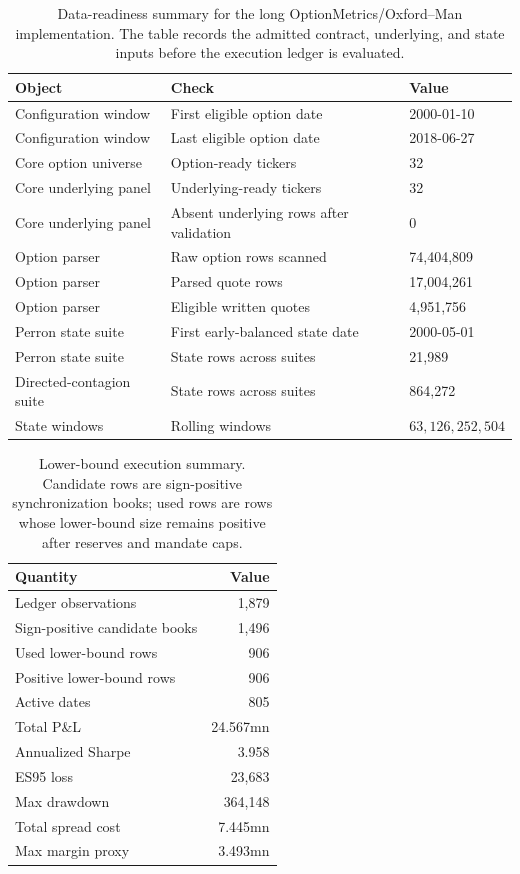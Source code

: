 \documentclass[11pt,a4paper]{amsart}
\newcommand{\tablecaptionskip}{\vspace{0.18em}}
\theoremstyle{plain}
\theoremstyle{definition}
\theoremstyle{remark}
\begin{document}
\begin{table}[H]
\centering
\caption{Data-readiness summary for the long OptionMetrics/Oxford--Man implementation.  The table
records the admitted contract, underlying, and state inputs before the execution ledger is
evaluated.}
\tablecaptionskip
\begin{tabular}{lll}
\toprule
Object & Check & Value\\
\midrule
Configuration window & First eligible option date & 2000-01-10\\
Configuration window & Last eligible option date & 2018-06-27\\
Core option universe & Option-ready tickers & 32\\
Core underlying panel & Underlying-ready tickers & 32\\
Core underlying panel & Absent underlying rows after validation & 0\\
Option parser & Raw option rows scanned & 74,404,809\\
Option parser & Parsed quote rows & 17,004,261\\
Option parser & Eligible written quotes & 4,951,756\\
Perron state suite & First early-balanced state date & 2000-05-01\\
Perron state suite & State rows across suites & 21,989\\
Directed-contagion suite & State rows across suites & 864,272\\
State windows & Rolling windows & \(63,126,252,504\)\\
\bottomrule
\end{tabular}
\label{tab:app-data-readiness}
\end{table}

\begin{table}[H]
\centering
\caption{Lower-bound execution summary.  Candidate rows are sign-positive synchronization
books; used rows are rows whose lower-bound size remains positive after reserves and mandate
caps.}
\tablecaptionskip
\begin{tabular}{lr}
\toprule
Quantity & Value\\
\midrule
Ledger observations & 1,879\\
Sign-positive candidate books & 1,496\\
Used lower-bound rows & 906\\
Positive lower-bound rows & 906\\
Active dates & 805\\
Total P\&L & 24.567mn\\
Annualized Sharpe & 3.958\\
ES95 loss & 23,683\\
Max drawdown & 364,148\\
Total spread cost & 7.445mn\\
Max margin proxy & 3.493mn\\
\bottomrule
\end{tabular}
\label{tab:app-native-summary}
\end{table}
\end{document}
